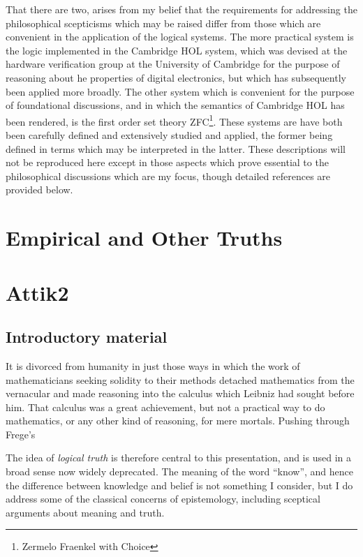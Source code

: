 \documentclass[10pt,titlepage]{book}
\begin{document}
That there are two, arises from my belief that the requirements for addressing the philosophical scepticisms which may be raised differ from those which are convenient in the application of the logical systems.
The more practical system is the logic implemented in the Cambridge HOL system, which was devised at the hardware verification group at the University of Cambridge for the purpose of reasoning about he properties of digital electronics, but which has subsequently been applied more broadly.
The other system which is convenient for the purpose of foundational discussions, and in which the semantics of Cambridge HOL has been rendered, is the first order set theory ZFC\footnote{Zermelo Fraenkel with Choice}.
These systems are have both been carefully defined and extensively studied and applied, the former being defined in terms which may be interpreted in the latter.
These descriptions will not be reproduced here except in those aspects which prove essential to the philosophical discussions which are my focus, though detailed references are provided below.
  


\chapter{Empirical and Other Truths}


\chapter{Attik2}

\section{Introductory material}

It is divorced from humanity in just those ways in which the work of mathematicians seeking solidity to their methods detached mathematics from the vernacular and made reasoning into the calculus which Leibniz had sought before him.
That calculus was a great achievement, but not a practical way to do mathematics, or any other kind of reasoning, for mere mortals.
Pushing through Frege's



The idea of \emph{logical truth} is therefore central to this presentation, and is used in a broad sense now widely deprecated.
The meaning of the word ``know'', and hence the difference between knowledge and belief is not something I consider, but I do address some of the classical concerns of epistemology, including sceptical arguments about meaning and truth.
\end{document}

